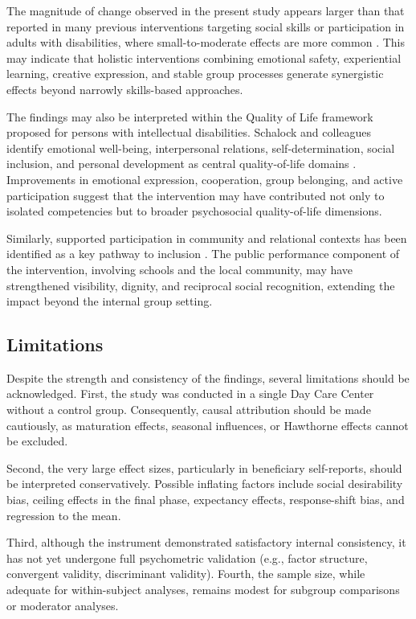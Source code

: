 \documentclass[journal]{IEEEtran}
\begin{document}
The magnitude of change observed in the present study appears larger than that reported in many previous interventions targeting social skills or participation in adults with disabilities, where small-to-moderate effects are more common \cite{hall2009,verdonschot2009}. This may indicate that holistic interventions combining emotional safety, experiential learning, creative expression, and stable group processes generate synergistic effects beyond narrowly skills-based approaches.

The findings may also be interpreted within the Quality of Life framework proposed for persons with intellectual disabilities. Schalock and colleagues identify emotional well-being, interpersonal relations, self-determination, social inclusion, and personal development as central quality-of-life domains \cite{schalock2010}. Improvements in emotional expression, cooperation, group belonging, and active participation suggest that the intervention may have contributed not only to isolated competencies but to broader psychosocial quality-of-life dimensions.

Similarly, supported participation in community and relational contexts has been identified as a key pathway to inclusion \cite{bigby2015}. The public performance component of the intervention, involving schools and the local community, may have strengthened visibility, dignity, and reciprocal social recognition, extending the impact beyond the internal group setting.

\subsection{Limitations}

Despite the strength and consistency of the findings, several limitations should be acknowledged. First, the study was conducted in a single Day Care Center without a control group. Consequently, causal attribution should be made cautiously, as maturation effects, seasonal influences, or Hawthorne effects cannot be excluded.

Second, the very large effect sizes, particularly in beneficiary self-reports, should be interpreted conservatively. Possible inflating factors include social desirability bias, ceiling effects in the final phase, expectancy effects, response-shift bias, and regression to the mean.

Third, although the instrument demonstrated satisfactory internal consistency, it has not yet undergone full psychometric validation (e.g., factor structure, convergent validity, discriminant validity). Fourth, the sample size, while adequate for within-subject analyses, remains modest for subgroup comparisons or moderator analyses.
\end{document}
